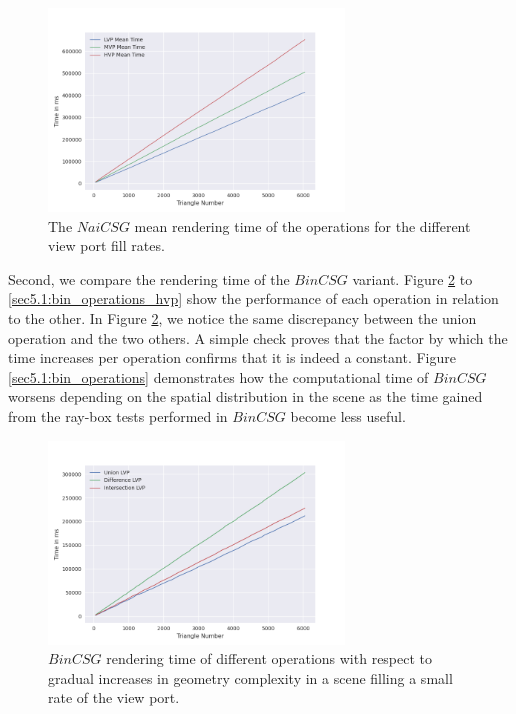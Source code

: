 \documentclass[a4paper,11pt,oneside]{article}
\begin{document}
\begin{figure}[H]
	\centering
	\includegraphics[width=0.7\textwidth]{section5/plots/naive_csg_mean.png}
	\caption{The $NaiCSG$ mean rendering time of the operations for the different view port fill rates.}
	\label{sec5.1:naive_operations}
\end{figure}

Second, we compare the rendering time of the $BinCSG$ variant. Figure \ref{sec5.1:bin_operations_lvp} to \ref{sec5.1:bin_operations_hvp} show the performance of each operation in relation to the other. In Figure \ref{sec5.1:bin_operations_lvp}, we notice the same discrepancy between the union operation and the two others. A simple check proves that the factor by which the time increases per operation confirms that it is indeed a constant. Figure \ref{sec5.1:bin_operations} demonstrates how the computational time of $BinCSG$ worsens depending on the spatial distribution in the scene as the time gained from the ray-box tests performed in $BinCSG$ become less useful.


\begin{figure}[H]
	\centering
	\includegraphics[width=0.7\textwidth]{section5/plots/bin_csg_lvp.png}
	\caption{$BinCSG$ rendering time of different operations with respect to gradual increases in geometry complexity in a scene filling a small rate of the view port.}
	\label{sec5.1:bin_operations_lvp}
\end{figure}
\end{document}
